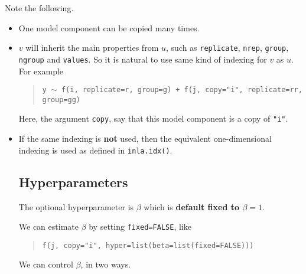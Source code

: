 \documentclass[a4paper,11pt]{article}
\begin{document}
Note the following.
\begin{itemize}
\item One model component can be copied many times.
\item $v$ will inherit the main properties from $u$, such as
    \texttt{replicate}, \texttt{nrep}, \texttt{group}, \texttt{ngroup}
    and \texttt{values}. So it is natural to use same kind of indexing
    for $v$ as $u$. For example
    \begin{quote}
        \texttt{y $\sim$ f(i, replicate=r, group=g) +
            f(j, copy="i", replicate=rr, group=gg)}
    \end{quote}
    Here, the argument \texttt{copy}, say that this model component
    is a copy of \texttt{"i"}.
\item If the same indexing is \textbf{not} used, then the equivalent
    one-dimensional indexing is used as defined in
    \texttt{inla.idx()}.

\subsection*{Hyperparameters}

The optional hyperparameter is $\beta$ which is \textbf{default fixed
    to $\beta=1$}.

We can estimate $\beta$ by setting \texttt{fixed=FALSE}, like
\begin{quote}
    \texttt{f(j, copy="i", hyper=list(beta=list(fixed=FALSE)))}
\end{quote}

We can control $\beta$, in two ways.
\end{itemize}
\end{document}
